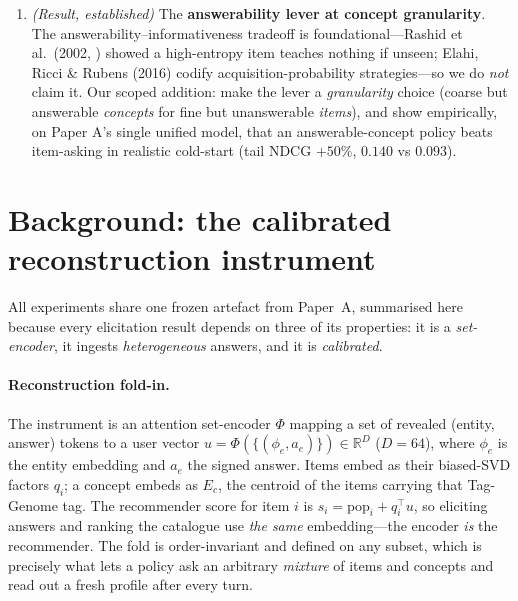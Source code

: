 \documentclass[11pt]{article}
\newcommand{\R}{\mathbb{R}}
\begin{document}
\begin{enumerate}
  action space, and \emph{under the noiseless graded/binary answer regime used by simulator evaluations including ours},
  greedy one-step EIG is the realizable frontier---behaviour cloning, oracle distillation, REINFORCE, and two-step
  lookahead all match it and none beats it (\S\ref{sec:discrete})---with the oracle's headroom provably unreachable (the
  privileged-imitation gap, Weihs et al.\ \cite{weihs21}; \S\ref{sec:gap}). The claim is emphatically \emph{not} that
  selection is irrelevant---\emph{which} action type and criterion one asks is the dominant lever (the divisiveness
  heuristic beats popularity, random, and items by wide margins, Tables~\ref{tab:answer_cold},~\ref{tab:learned})---but
  that \emph{learning or per-user adapting} that selection adds nothing over the static surrogate in this regime. This is
  the expected outcome for discrete short horizons and localizes where a learned policy \emph{can} pay off:
  \emph{continuous} spaces.
  \item \emph{(Result, established)} The \textbf{answerability lever at concept granularity}. The
  answerability--informativeness tradeoff is foundational---Rashid et al.\ (2002, \cite{rashid}) showed a high-entropy item
  teaches nothing if unseen; Elahi, Ricci \& Rubens (2016) codify acquisition-probability strategies---so we do \emph{not}
  claim it. Our scoped addition: make the lever a \emph{granularity} choice (coarse but answerable \emph{concepts} for fine
  but unanswerable \emph{items}), and show empirically, on Paper A's single unified model, that an answerable-concept policy
  beats item-asking in realistic cold-start (tail NDCG $+50\%$, $0.140$ vs $0.093$).
\end{enumerate}

\section{Background: the calibrated reconstruction instrument}\label{sec:background}
All experiments share one frozen artefact from Paper~A, summarised here because every elicitation result
depends on three of its properties: it is a \emph{set-encoder}, it ingests \emph{heterogeneous} answers,
and it is \emph{calibrated}.

\paragraph{Reconstruction fold-in.} The instrument is an attention set-encoder $\Phi$ mapping a set of
revealed (entity, answer) tokens to a user vector $u=\Phi(\{(\phi_e,a_e)\})\in\R^{D}$ ($D{=}64$), where
$\phi_e$ is the entity embedding and $a_e$ the signed answer. Items embed as their biased-SVD factors
$q_i$; a concept embeds as $E_c$, the centroid of the items carrying that Tag-Genome tag. The
recommender score for item $i$ is $s_i=\mathrm{pop}_i+q_i^\top u$, so eliciting answers and ranking the
catalogue use \emph{the same} embedding---the encoder \emph{is} the recommender. The fold is
order-invariant and defined on any subset, which is precisely what lets a policy ask an arbitrary
\emph{mixture} of items and concepts and read out a fresh profile after every turn.
\end{document}
